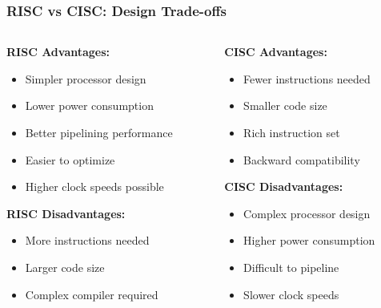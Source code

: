 \begin{frame}
\frametitle{RISC vs CISC: Design Trade-offs}
\begin{columns}[T]
\begin{column}{0.48\textwidth}
\textbf{RISC Advantages:}
\begin{itemize}
    \item Simpler processor design
    \item Lower power consumption
    \item Better pipelining performance
    \item Easier to optimize
    \item Higher clock speeds possible
\end{itemize}
\textbf{RISC Disadvantages:}
\begin{itemize}
    \item More instructions needed
    \item Larger code size
    \item Complex compiler required
\end{itemize}
\end{column}
\begin{column}{0.48\textwidth}
\textbf{CISC Advantages:}
\begin{itemize}
    \item Fewer instructions needed
    \item Smaller code size
    \item Rich instruction set
    \item Backward compatibility
\end{itemize}
\textbf{CISC Disadvantages:}
\begin{itemize}
    \item Complex processor design
    \item Higher power consumption
    \item Difficult to pipeline
    \item Slower clock speeds
\end{itemize}
\end{column}
\end{columns}
\end{frame}

